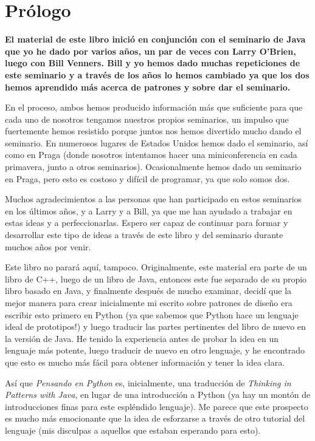 \section*{Prólogo}
\label{sec:prolo}

\textbf{El material de este libro inició en conjunción con el seminario de Java que yo he dado por varios años, un par de veces con Larry O’Brien, luego con Bill Venners. Bill y yo hemos dado muchas repeticiones de este seminario y a través de los años lo hemos cambiado ya que los dos hemos aprendido más acerca de patrones y sobre dar el seminario.}\newline

En el proceso, ambos hemos producido información más que suficiente para que cada uno de nosotros tengamos nuestros propios seminarios, un impulso que fuertemente hemos resistido porque juntos nos hemos divertido mucho dando el seminario. En numerosos lugares de Estados Unidos hemos dado el seminario, así como en Praga (donde nosotros intentamos hacer una miniconferencia en cada primavera, junto a otros seminarios). Ocasionalmente hemos dado  un seminario en Praga, pero esto es costoso y difícil de programar, ya que solo somos dos.\newline

Muchos agradecimientos a las personas que han participado en estos seminarios en los últimos años, y a Larry y a Bill, ya que me han ayudado a trabajar en estas ideas y a perfeccionarlas. Espero ser capaz de continuar para formar y desarrollar este tipo de ideas a través de este libro y del seminario durante muchos años por venir. \newline 

Este libro no parará aquí, tampoco. Originalmente, este material era parte de un libro de C++, luego de un libro de Java, entonces este fue separado de su propio libro basado en Java, y finalmente después de mucho examinar, decidí que la mejor manera para crear inicialmente mi escrito sobre patrones de diseño era escribir esto primero en Python (ya que sabemos que Python hace un lenguaje ideal de prototipos!) y luego traducir las partes pertinentes del libro de nuevo en la versión de Java.  He tenido la experiencia antes de probar la idea en un lenguaje más potente, luego traducir de nuevo en otro lenguaje, y he encontrado que esto es mucho más fácil para obtener información y tener la idea clara.\newline

Así que \textit{Pensando en Python} es, inicialmente, una traducción de \textit{Thinking in Patterns with Java}, en lugar de una introducción a Python (ya hay un montón de introducciones finas para este espléndido lenguaje). Me parece que este prospecto es mucho más emocionante que la idea de esforzarse a través de otro tutorial del lenguaje (mis disculpas a aquellos que estaban esperando para esto).

\newpage 